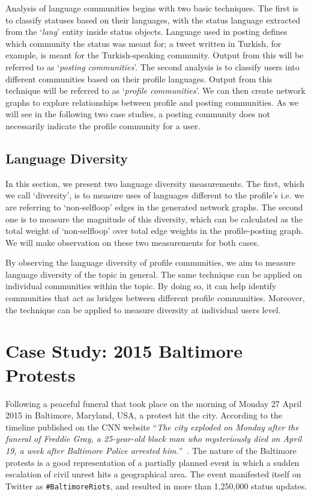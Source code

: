 \documentclass{llncs}
\begin{document}
Analysis of language communities begins with two basic techniques. The
first is to classify statuses based on their languages, with the
status language extracted from the `{\emph{lang}}' entity inside
status objects. Language used in posting defines which community the
status was meant for; a tweet written in Turkish, for example, is
meant for the Turkish-speaking community. Output from this will be
referred to as `{\emph{posting communities}}'. The second analysis is
to classify users into different communities based on their profile
languages. Output from this technique will be referred to as
`{\emph{profile communities}}'. We can then create network graphs to
explore relationships between profile and posting communities.  As we
will see in the following two case studies, a posting community does
not necessarily indicate the profile community for a user.

\subsection{Language Diversity}\label{diversity}

In this section, we present two language diversity measurements. The
first, which we call `diversity', is to measure uses of languages
different to the profile's i.e. we are referring to `non-selfloop'
edges in the generated network graphs. The second one is to measure
the magnitude of this diversity, which can be calculated as the total
weight of `non-selfloop' over total edge weights in the
profile-posting graph. We will make observation on these two
measurements for both cases.

By observing the language diversity of profile communities, we aim to
measure language diversity of the topic in general. The same technique
can be applied on individual communities within the topic. By doing
so, it can help identify communities that act as bridges between
different profile communities. Moreover, the technique can be applied
to measure diversity at individual users level.


\section{Case Study: 2015 Baltimore Protests}\label{baltimorecasestudy}

Following a peaceful funeral that took place on the morning of Monday
27 April 2015 in Baltimore, Maryland, USA, a protest hit the
city. According to the timeline published on the CNN website
``{\emph{The city exploded on Monday after the funeral of Freddie
Gray, a 25-year-old black man who mysteriously died on April 19, a
week after Baltimore Police arrested
him.}}''~\cite{baltimorewiki:2015}. The nature of the Baltimore
protests is a good representation of a partially planned event in
which a sudden escalation of civil unrest hits a geographical area. The
event manifested itself on Twitter as {\texttt{\#BaltimoreRiots}}, and
resulted in more than 1,250,000 status updates.
\end{document}
